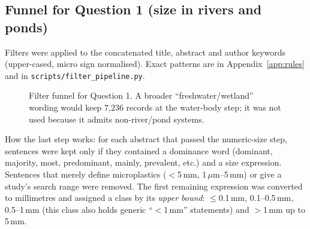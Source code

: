 \documentclass[11pt,a4paper]{article}
\newcommand{\um}{\,\ensuremath{\mu}m}
\begin{document}
\subsection{Funnel for Question 1 (size in rivers and ponds)}
Filters were applied to the concatenated title, abstract and author keywords (upper-cased, micro sign normalised). Exact patterns are in Appendix~\ref{app:rules} and in \texttt{scripts/filter\_pipeline.py}.

\begin{figure}[H]\centering
{}
\caption{Filter funnel for Question 1. A broader ``freshwater/wetland'' wording would keep 7,236 records at the water-body step; it was not used because it admits non-river/pond systems.}
\end{figure}

How the last step works: for each abstract that passed the numeric-size step, sentences were kept only if they contained a dominance word (dominant, majority, most, predominant, mainly, prevalent, etc.) and a size expression. Sentences that merely define microplastics ($<$5\,mm, 1\um--5\,mm) or give a study's search range were removed. The first remaining expression was converted to millimetres and assigned a class by its \emph{upper bound}: $\le$0.1\,mm, 0.1--0.5\,mm, 0.5--1\,mm (this class also holds generic ``$<$1\,mm'' statements) and $>$1\,mm up to 5\,mm.
\end{document}
